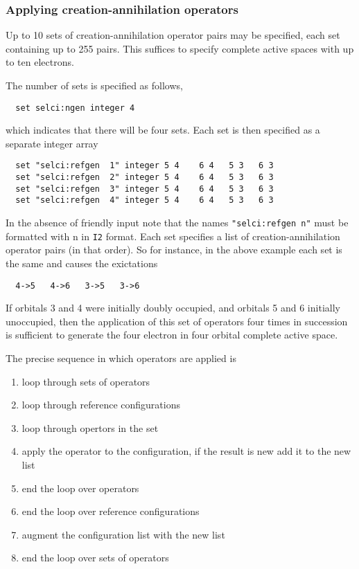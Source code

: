 \subsubsection{Applying creation-annihilation operators}

Up to 10 sets of creation-annihilation operator pairs may be
specified, each set containing up to 255 pairs.  This suffices to
specify complete active spaces with up to ten electrons.

The number of sets is specified as follows,
\begin{verbatim}
  set selci:ngen integer 4
\end{verbatim}
which indicates that there will be four sets.  Each set is then
specified as a separate integer array
\begin{verbatim}
  set "selci:refgen  1" integer 5 4    6 4   5 3   6 3  
  set "selci:refgen  2" integer 5 4    6 4   5 3   6 3  
  set "selci:refgen  3" integer 5 4    6 4   5 3   6 3  
  set "selci:refgen  4" integer 5 4    6 4   5 3   6 3  
\end{verbatim}
In the absence of friendly input note that the names
\verb+"selci:refgen n"+ must be formatted with n in \verb+I2+
format. Each set specifies a list of creation-annihilation operator
pairs (in that order).  So for instance, in the above example each set
is the same and causes the exictations
\begin{verbatim}
  4->5   4->6   3->5   3->6
\end{verbatim}
If orbitals 3 and 4 were initially doubly occupied, and orbitals 5 and
6 initially unoccupied, then the application of this set of operators
four times in succession is sufficient to generate the four electron
in four orbital complete active space.

The precise sequence in which operators are applied is
\begin{enumerate}
\item loop through sets of operators
\item loop through reference configurations
\item loop through opertors in the set
\item apply the operator to the configuration, if the result is new add it
  to the new list
\item end the loop over operators
\item end the loop over reference configurations
\item augment the configuration list with the new list
\item end the loop over sets of operators
\end{enumerate}

